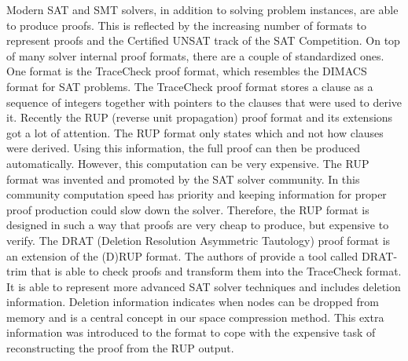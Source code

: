 Modern SAT and SMT solvers, in addition to solving problem instances, are able to produce proofs.
This is reflected by the increasing number of formats to represent proofs and the Certified UNSAT track of the SAT Competition.
On top of many solver internal proof formats, there are a couple of standardized ones.
One format is the TraceCheck proof format, which resembles the DIMACS format for SAT problems.
The TraceCheck proof format stores a clause as a sequence of integers together with pointers to the clauses that were used to derive it.
Recently the RUP (reverse unit propagation) proof format and its extensions got a lot of attention.
The RUP format only states which and not how clauses were derived.
Using this information, the full proof can then be produced automatically.
However, this computation can be very expensive.
The RUP format was invented and promoted by the SAT solver community.
In this community computation speed has priority and keeping information for proper proof production could slow down the solver.
Therefore, the RUP format is designed in such a way that proofs are very cheap to produce, but expensive to verify.
The DRAT (Deletion Resolution Asymmetric Tautology) proof format \cite{Wetzler2014} is an extension of the (D)RUP format.
The authors of \cite{Wetzler2014} provide a tool called DRAT-trim that is able to check proofs and transform them into the TraceCheck format.
It is able to represent more advanced SAT solver techniques and includes deletion information.
Deletion information indicates when nodes can be dropped from memory and is a central concept in our space compression method.
This extra information was introduced to the format to cope with the expensive task of reconstructing the proof from the RUP output.


